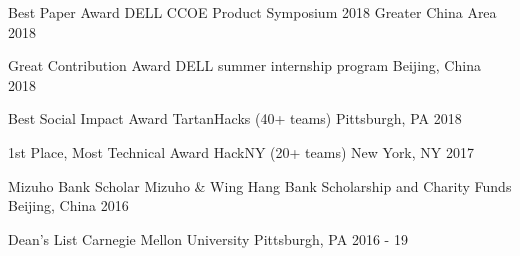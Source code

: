 

\begin{cvhonors}

  \cvhonor
    {Best Paper Award} %
    {DELL CCOE Product Symposium 2018} %
    {Greater China Area} %
    {2018} %

  \cvhonor
    {Great Contribution Award} %
    {DELL summer internship program} %
    {Beijing, China} %
    {2018} %

  \cvhonor
    {Best Social Impact Award} %
    {TartanHacks (40+ teams)} %
    {Pittsburgh, PA} %
    {2018} %

  \cvhonor
    {1st Place, Most Technical Award} %
    {HackNY (20+ teams)} %
    {New York, NY} %
    {2017} %

  \cvhonor
    {Mizuho Bank Scholar} %
    {Mizuho \& Wing Hang Bank Scholarship and Charity Funds} %
    {Beijing, China} %
    {2016} %

  \cvhonor
    {Dean's List} %
    {Carnegie Mellon University} %
    {Pittsburgh, PA} %
    {2016 - 19} %

\end{cvhonors}
